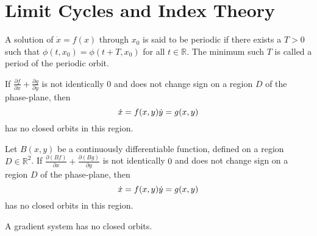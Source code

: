 \section{Limit Cycles and Index Theory}
\begin{definition}
    A solution of $\dot x = f(x)$ through $x_0$ is said to be periodic if there exists a $T > 0$ such that $\phi(t, x_0) = \phi(t + T, x_0)$ for all $t \in \mathbb R$. The minimum such $T$ is called a period of the periodic orbit.
\end{definition}

\begin{theorem}[Bendixson]
    If $\frac{\partial f}{\partial x} + \frac{\partial g}{\partial y}$ is not identically $0$ and does not change sign on a region $D$ of the phase-plane, then
    \begin{equation}
        \dot x = f(x, y) \\
        \dot y = g(x, y)
    \end{equation}
    has no closed orbits in this region.
\end{theorem}

\begin{theorem}[Dulac]
    Let $B(x, y)$ be a continuously differentiable function, defined on a region $D \in \mathbb R^2$. If $\frac{\partial{(Bf)}}{\partial x} + \frac{\partial{(Bg)}}{\partial y}$ is not identically $0$ and does not change sign on a region $D$ of the phase-plane, then
    \begin{equation}
        \dot x = f(x, y) \\
        \dot y = g(x, y)
    \end{equation}
    has no closed orbits in this region.
\end{theorem}

\begin{claim}
    A gradient system has no closed orbits.
\end{claim}

